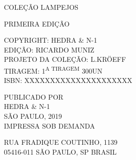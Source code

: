 {{{\vspace{1cm}

COLEÇÃO LAMPEJOS

\vspace{0.5cm}

PRIMEIRA EDIÇÃO

\vspace{0.5cm}

COPYRIGHT: HEDRA \& N-1\\
EDIÇÃO: RICARDO MUNIZ\\
PROJETO DA COLEÇÃO: L.KRÖEFF\\
TIRAGEM: 1\textsuperscript{A TIRAGEM} 300UN\\
ISBN: XXXXXXXXXXXXXXXXXXXXX\\

\vspace{1cm}

PUBLICADO POR\\
HEDRA \& N-1\\
SÃO PAULO, 2019\\
IMPRESSA SOB DEMANDA\\

\vspace{0.5cm}

RUA FRADIQUE COUTINHO, 1139\\
05416-011 SÃO PAULO, SP BRASIL

}}


{}
\vspace{11.25mm}


}
